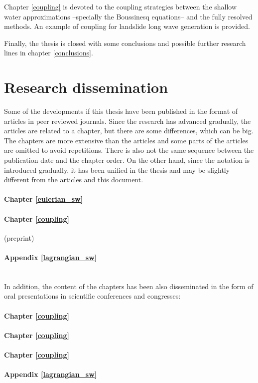 Chapter \ref{coupling} is devoted to the coupling strategies between the shallow water approximations --specially the Boussinesq equations-- and the fully resolved methods. An example of coupling for landslide long wave generation is provided.

Finally, the thesis is closed with some conclusions and possible further research lines in chapter \ref{conclusions}.







\section{Research dissemination}


Some of the developments if this thesis have been published in the format of articles in peer reviewed journals. Since the research has advanced gradually, the articles are related to a chapter, but there are some differences, which can be big.
The chapters are more extensive than the articles and some parts of the articles are omitted to avoid repetitions.
There is also not the same sequence between the publication date and the chapter order.
On the other hand, since the notation is introduced gradually, it has been unified in the thesis and may be slightly different from the articles and this document.

\paragraph{Chapter \ref{eulerian_sw}} 
\paragraph{Chapter \ref{coupling}}  (preprint)
\paragraph{Appendix \ref{lagrangian_sw}} 
\\

In addition, the content of the chapters has been also disseminated in the form of oral presentations in scientific conferences and congresses:

\paragraph{Chapter \ref{coupling}} 
\paragraph{Chapter \ref{coupling}} 
\paragraph{Chapter \ref{coupling}} 
\paragraph{Appendix \ref{lagrangian_sw}} 

